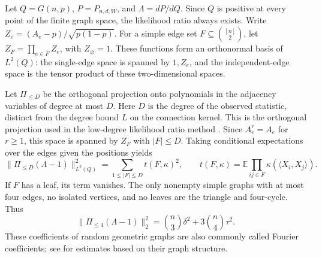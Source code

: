 \documentclass[11pt,reqno]{amsart}
\numberwithin{equation}{section}
\theoremstyle{definition}
\theoremstyle{remark}
\theoremstyle{definition}
\begin{document}
Let $Q=G(n,p)$, $P=P_{n,d,W}$, and $\Lambda=dP/dQ$.
Since $Q$ is positive at every point of the finite graph space, the likelihood ratio always exists.
Write $Z_e=(A_e-p)/\sqrt{p(1-p)}$.
For a simple edge set $F\subseteq\binom{[n]}2$, let $Z_F=\prod_{e\in F}Z_e$, with $Z_\varnothing=1$.
These functions form an orthonormal basis of $L^2(Q)$: the single-edge space is spanned by $1,Z_e$,
and the independent-edge space is the tensor product of these two-dimensional spaces.

Let $\Pi_{\le D}$ be the orthogonal projection onto polynomials in the adjacency variables of degree at most $D$.
Here $D$ is the degree of the observed statistic, distinct from the degree bound $L$ on the connection kernel.
This is the orthogonal projection used in the low-degree likelihood ratio method \cite{KWB}.
Since $A_e^r=A_e$ for $r\ge1$, this space is spanned by $Z_F$ with $|F|\le D$.
Taking conditional expectations over the edges given the positions yields
\begin{equation}\label{eq:projection-identity}
 \|\Pi_{\le D}(\Lambda-1)\|_{L^2(Q)}^2
 =\sum_{1\le|F|\le D}t(F,\kappa)^2,\qquad
 t(F,\kappa)=\mathbb E\prod_{ij\in F}\kappa(\langle X_i,X_j\rangle).
\end{equation}
If $F$ has a leaf, its term vanishes.
The only nonempty simple graphs with at most four edges, no isolated vertices, and no leaves are the triangle and four-cycle. Thus
\begin{equation}\label{eq:projection-four}
 \|\Pi_{\le4}(\Lambda-1)\|_2^2
 =\binom n3\delta^2+3\binom n4\tau^2.
\end{equation}
These coefficients of random geometric graphs are also commonly called Fourier coefficients;
see \cite{BBfourier,BBalgebra} for estimates based on their graph structure.
\end{document}
